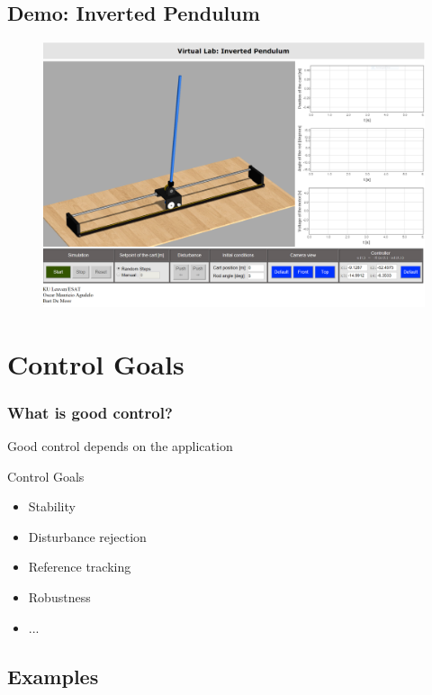 \subsection[Demo: Inverted Pendulum]{Demo: Inverted Pendulum}
\begin{frame}
	\begin{figure}
\centering
\href{http://homes.esat.kuleuven.be/~magudelo/_html5/test11.html}{\includegraphics[width=1\linewidth]{"inverted-pendulum/full"}}
\label{fig:InvertedPendulum}
\end{figure}
\end{frame}

\section{Control Goals}
\begin{frame}
	\frametitle{What is good control?}
	\begin{block}{}
		Good control depends on the application
	\end{block}
	\begin{block}{Control Goals}
		\begin{itemize}
			\item Stability
			\item Disturbance rejection
			\item Reference tracking
			\item Robustness
			\item ...
		\end{itemize}
	\end{block}
\end{frame}

\subsection[Examples]{Examples}

